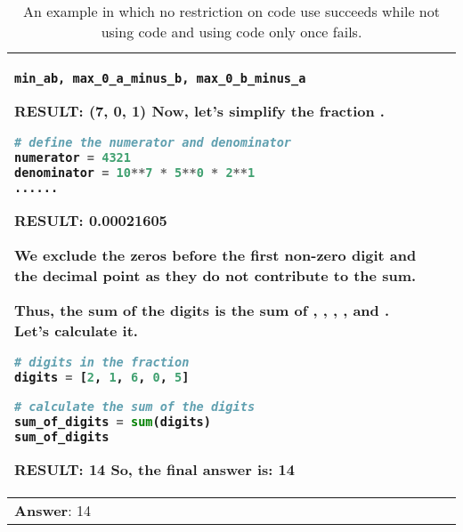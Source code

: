 \documentclass{article} \usepackage{iclr2023_conference,times}
\begin{document}
\begin{table*}[ht]
\begin{tabular}{p{}|p{}|p{}}
\begin{lstlisting}[language=Python]
min_ab, max_0_a_minus_b, max_0_b_minus_a
     \end{lstlisting} 
    \textbf{RESULT:}\newline
    \textbf{(7, 0, 1)}\newline
    Now, let's simplify the fraction .
         \begin{lstlisting}[language=Python]
# define the numerator and denominator
numerator = 4321
denominator = 10**7 * 5**0 * 2**1
......
     \end{lstlisting} 
    \textbf{RESULT:}\newline
    \textbf{0.00021605}\newline

We exclude the zeros before the first non-zero digit and the decimal point as they do not contribute to the sum.

Thus, the sum of the digits is the sum of , , , , and . Let's calculate it.
        \lstset{style=mystyle}
     \begin{lstlisting}[language=Python]
# digits in the fraction
digits = [2, 1, 6, 0, 5]

# calculate the sum of the digits
sum_of_digits = sum(digits)
sum_of_digits
     \end{lstlisting} 
    \textbf{RESULT:}\newline
    \textbf{14}\newline
    So, the final answer is: 14
     \\
     \midrule

      \multicolumn{3}{p{0.90\textwidth}}{\small \textbf{Answer}: 14}
\\
     \bottomrule
    \end{tabular}
    \caption{An example in which no restriction on code use succeeds while not using code and using code only once fails.}
    \label{tab:code_freq_example2}
\end{table*}
\end{document}
